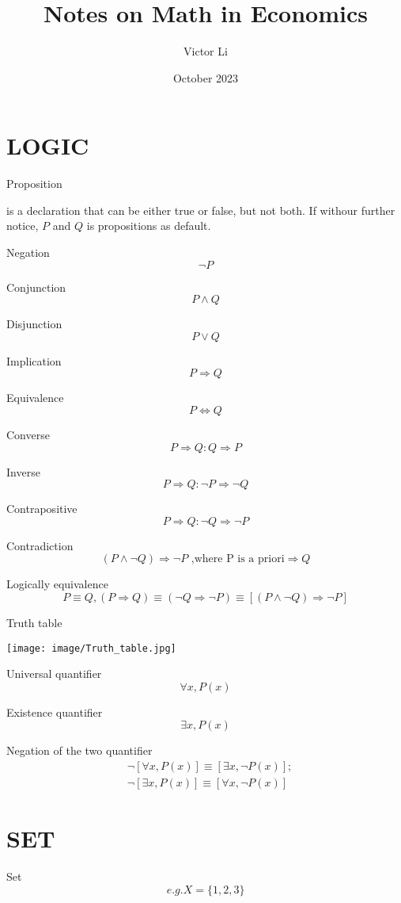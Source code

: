 \documentclass{article}
\title{Notes on Math in Economics}
\author{Victor Li}
\date{October 2023}
\begin{document}
\maketitle

\tableofcontents

\newpage
\section{LOGIC}

\setlength{\parindent}{0pt}%

Proposition

is a declaration that can be either true or false, but not both. If withour further notice, $P$ and $Q$ is propositions as default.

Negation
$$\neg P$$

Conjunction
$$P\land Q$$

Disjunction
$$P \lor Q$$

Implication
$$P \Rightarrow Q$$

Equivalence
$$P \iff Q$$

Converse
$$P \Rightarrow Q: Q \Rightarrow P$$

Inverse
$$P \Rightarrow Q: \neg P \Rightarrow \neg Q$$

Contrapositive
$$P \Rightarrow Q: \neg Q \Rightarrow \neg P$$

Contradiction
$$(P\land \neg Q) \Rightarrow \neg P \text{ ,where P is a priori} \Rightarrow Q$$

Logically equivalence
$$P\equiv Q,(P \Rightarrow Q)\equiv(\neg Q \Rightarrow \neg P)\equiv[(P\land \neg Q) \Rightarrow \neg P]$$

Truth table

\texttt{[image: image/Truth\_table.jpg]}


Universal quantifier
$$\forall x, P(x)$$

Existence quantifier
$$\exists x, P(x)$$

Negation of the two quantifier
\begin{align}
&\neg[\forall x, P(x)] \equiv [\exists x, \neg P(x)];
\\& \neg[\exists x,P(x)]\equiv [\forall x,\neg P(x)]
\end{align}

\newpage
\section{SET}
Set
$$e.g.X=\{1,2,3\}$$
\end{document}
